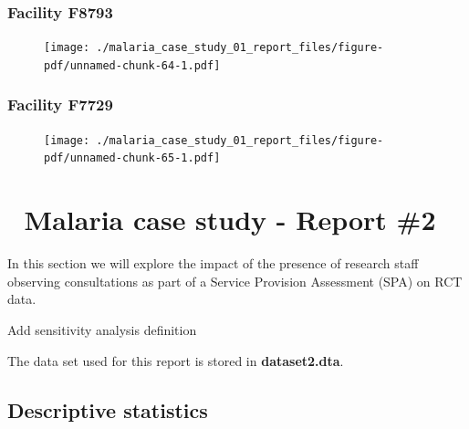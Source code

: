 \documentclass[
  letterpaper,
  DIV=11,
  numbers=noendperiod,
  oneside]{scrreprt}
\begin{document}
\hypertarget{facility-f8793}{%
\subsection{Facility F8793}\label{facility-f8793}}

\begin{figure}

\texttt{[image: ./malaria\_case\_study\_01\_report\_files/figure-pdf/unnamed-chunk-64-1.pdf]}

\end{figure}

\hypertarget{facility-f7729}{%
\subsection{Facility F7729}\label{facility-f7729}}

\begin{figure}

\texttt{[image: ./malaria\_case\_study\_01\_report\_files/figure-pdf/unnamed-chunk-65-1.pdf]}

\end{figure}

\hypertarget{malaria-case-study---report-2}{%
\chapter{\texorpdfstring{{📙} Malaria case study - Report
\#2}{📙 Malaria case study - Report \#2}}\label{malaria-case-study---report-2}}

In this section we will explore the impact of the presence of research
staff observing consultations as part of a Service Provision Assessment
(SPA) on RCT data.

\begin{tcolorbox}[enhanced jigsaw, colbacktitle=quarto-callout-note-color!10!white, titlerule=0mm, breakable, opacityback=0, opacitybacktitle=0.6, left=2mm, coltitle=black, colback=white, title=\textcolor{quarto-callout-note-color}{\faInfo}\hspace{0.5em}{Note}, rightrule=.15mm, colframe=quarto-callout-note-color-frame, toprule=.15mm, bottomtitle=1mm, toptitle=1mm, arc=.35mm, bottomrule=.15mm, leftrule=.75mm]
Add sensitivity analysis definition
\end{tcolorbox}

The data set used for this report is stored in \textbf{dataset2.dta}.

\hypertarget{descriptive-statistics-1}{%
\section{Descriptive statistics}\label{descriptive-statistics-1}}
\end{document}
